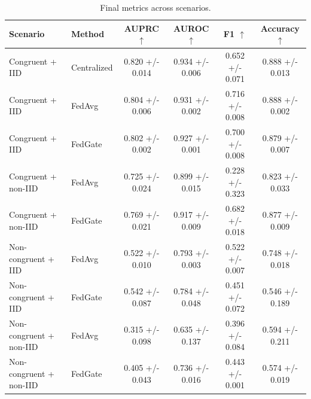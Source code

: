\begin{table}[t]
\centering
\caption{Final metrics across scenarios.}
\label{tab:paper_final_metrics}
\begin{tabular}{llcccc}
\toprule
Scenario & Method & AUPRC $\uparrow$ & AUROC $\uparrow$ & F1 $\uparrow$ & Accuracy $\uparrow$ \\
\midrule
Congruent + IID & Centralized & 0.820 +/- 0.014 & 0.934 +/- 0.006 & 0.652 +/- 0.071 & 0.888 +/- 0.013 \\
Congruent + IID & FedAvg & 0.804 +/- 0.006 & 0.931 +/- 0.002 & 0.716 +/- 0.008 & 0.888 +/- 0.002 \\
Congruent + IID & FedGate & 0.802 +/- 0.002 & 0.927 +/- 0.001 & 0.700 +/- 0.008 & 0.879 +/- 0.007 \\
Congruent + non-IID & FedAvg & 0.725 +/- 0.024 & 0.899 +/- 0.015 & 0.228 +/- 0.323 & 0.823 +/- 0.033 \\
Congruent + non-IID & FedGate & 0.769 +/- 0.021 & 0.917 +/- 0.009 & 0.682 +/- 0.018 & 0.877 +/- 0.009 \\
Non-congruent + IID & FedAvg & 0.522 +/- 0.010 & 0.793 +/- 0.003 & 0.522 +/- 0.007 & 0.748 +/- 0.018 \\
Non-congruent + IID & FedGate & 0.542 +/- 0.087 & 0.784 +/- 0.048 & 0.451 +/- 0.072 & 0.546 +/- 0.189 \\
Non-congruent + non-IID & FedAvg & 0.315 +/- 0.098 & 0.635 +/- 0.137 & 0.396 +/- 0.084 & 0.594 +/- 0.211 \\
Non-congruent + non-IID & FedGate & 0.405 +/- 0.043 & 0.736 +/- 0.016 & 0.443 +/- 0.001 & 0.574 +/- 0.019 \\
\bottomrule
\end{tabular}
\end{table}
